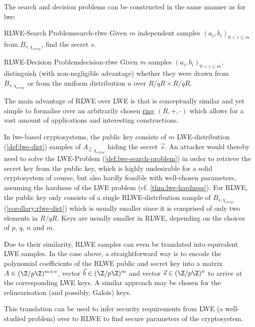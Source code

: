 The search and decision problems can be constructed in the same manner as for \gls{lwe}:

\begin{corollary}{RLWE-Search Problem}{search-rlwe}
  Given $m$ independent samples $(a_i, b_i)_{0 < i \leq m}$ from $B_{s, \chi_{error}}$, find the secret $s$.
\end{corollary}
\begin{corollary}{RLWE-Decision Problem}{decision-rlwe}
  Given $m$ samples $(a_i, b_i)_{0 < i \leq m}$, distinguish (with non-negligible advantage) whether they were drawn from $B_{s, \chi_{error}}$ or from the uniform distribution $u$ over $R/qR \times R/qR$.
\end{corollary}

The main advantage of RLWE over LWE is that is conceptually similar and yet simple to formalise over an arbitrarily chosen \hyperref[def:ring]{ring} $(R, +, \cdot)$ which allows for a vast amount of applications and interesting constructions.

In \gls{lwe}-based cryptosystems, the public key consists of $m$ LWE-distribution (\cref{def:lwe-dist}) samples of $A_{\vec{s},\chi_{error}}$ hiding the secret $\vec{s}$.
An attacker would thereby need to solve the LWE-Problem (\cref{def:lwe-search-problem}) in order to retrieve the secret key from the public key, which is highly undesirable for a solid cryptosystem of course, but also hardly feasible with well-chosen parameters, assuming the hardness of the LWE problem (cf. \cref{thm:lwe-hardness}).
For RLWE, the public key only consists of a single RLWE-distribution sample of $B_{s, \chi_{error}}$ (\cref{corollary:rlwe-dist}) which is usually smaller since it is comprised of only two elements in $R/qR$.
Keys are usually smaller in RLWE, depending on the choices of $p$, $q$, $n$ and $m$.

Due to their similarity, RLWE samples can even be translated into equivalent LWE samples.
In the case above, a straightforward way is to encode the polynomial coefficients of the RLWE public and secret key into a matrix $A \in (\Z/p\Z)^{m \times n}$, vector $\vec{b} \in (\Z/p\Z)^m$ and vector $\vec{s} \in (\Z/p\Z)^n$ to arrive at the corresponding LWE keys.
A similar approach may be chosen for the relinearisation (and possibly, Galois) keys.

This translation can be used to infer security requirements from LWE (a well-studied problem) over to RLWE to find secure parameters of the cryptosystem.

\pagebreak
